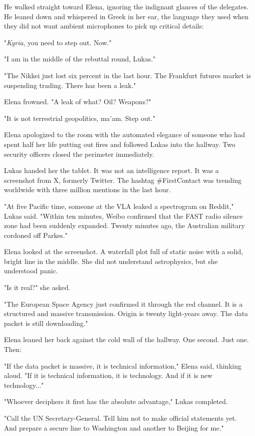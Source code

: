\documentclass[11pt,a5paper,twoside]{book}
\begin{document}
He walked straight toward Elena, ignoring the indignant glances of the delegates. He leaned down and whispered in Greek in her ear, the language they used when they did not want ambient microphones to pick up critical details:

"\textit{Kyria}, you need to step out. Now."

"I am in the middle of the rebuttal round, Lukas."

"The Nikkei just lost six percent in the last hour. The Frankfurt futures market is suspending trading. There has been a leak."

Elena frowned. "A leak of what? Oil? Weapons?"

"It is not terrestrial geopolitics, ma'am. Step out."

Elena apologized to the room with the automated elegance of someone who had spent half her life putting out fires and followed Lukas into the hallway. Two security officers closed the perimeter immediately.

Lukas handed her the tablet. It was not an intelligence report. It was a screenshot from X, formerly Twitter. The hashtag \#FirstContact was trending worldwide with three million mentions in the last hour.

"At five Pacific time, someone at the VLA leaked a spectrogram on Reddit," Lukas said. "Within ten minutes, Weibo confirmed that the FAST radio silence zone had been suddenly expanded. Twenty minutes ago, the Australian military cordoned off Parkes."

Elena looked at the screenshot. A waterfall plot full of static noise with a solid, bright line in the middle. She did not understand astrophysics, but she understood panic.

"Is it real?" she asked.

"The European Space Agency just confirmed it through the red channel. It is a structured and massive transmission. Origin is twenty light-years away. The data packet is still downloading."

Elena leaned her back against the cold wall of the hallway. One second. Just one. Then:

"If the data packet is massive, it is technical information," Elena said, thinking aloud. "If it is technical information, it is technology. And if it is new technology..."

"Whoever deciphers it first has the absolute advantage," Lukas completed.

"Call the UN Secretary-General. Tell him not to make official statements yet. And prepare a secure line to Washington and another to Beijing for me."
\end{document}
